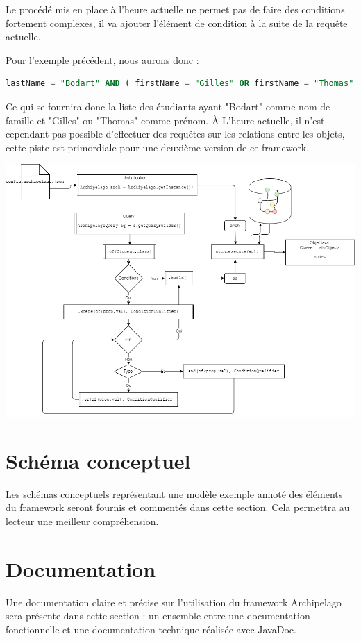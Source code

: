 \documentclass[a4paper,fleqn,12pt]{report}
\begin{document}
Le procédé mis en place à l'heure actuelle ne permet pas de faire des conditions fortement complexes, il va ajouter l'élément de condition à la suite de la requête actuelle. 

Pour l'exemple précédent, nous aurons donc : 

\begin{lstlisting}[language=SQL]
lastName = "Bodart" AND ( firstName = "Gilles" OR firstName = "Thomas")
\end{lstlisting}

Ce qui se fournira donc la liste des étudiants ayant "Bodart" comme nom de famille et "Gilles" ou "Thomas" comme prénom. \`A L'heure actuelle, il n'est cependant pas possible d'effectuer des requêtes sur les relations entre les objets, cette piste est primordiale pour une deuxième version de ce framework.

\begin{center}
\includegraphics[scale=0.4]{figures/query.png}
\label{fig:Query}
\end{center}



\section{Schéma conceptuel}
Les schémas conceptuels représentant une modèle exemple annoté des éléments du framework seront fournis et commentés dans cette section. Cela permettra au lecteur une meilleur compréhension.
\section{Documentation}
Une documentation claire et précise sur l'utilisation du framework Archipelago sera présente dans cette section : un ensemble entre une documentation fonctionnelle et une documentation technique réalisée avec JavaDoc.
\end{document}
